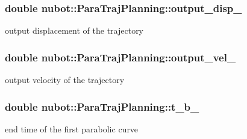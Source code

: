\hypertarget{classnubot_1_1ParaTrajPlanning_a7cb561e9f25a00ef8a2589addcf7bbf8}{
\subsubsection[{output\-\_\-disp\-\_\-}]{\setlength{\rightskip}{0pt plus 5cm}double nubot\-::\-Para\-Traj\-Planning\-::output\-\_\-disp\-\_\-\hspace{0.3cm}{\ttfamily [private]}}}\label{classnubot_1_1ParaTrajPlanning_a7cb561e9f25a00ef8a2589addcf7bbf8}


output displacement of the trajectory 

\hypertarget{classnubot_1_1ParaTrajPlanning_a3a7a57f2f03c1a13b30a4368561cf048}{
\subsubsection[{output\-\_\-vel\-\_\-}]{\setlength{\rightskip}{0pt plus 5cm}double nubot\-::\-Para\-Traj\-Planning\-::output\-\_\-vel\-\_\-\hspace{0.3cm}{\ttfamily [private]}}}\label{classnubot_1_1ParaTrajPlanning_a3a7a57f2f03c1a13b30a4368561cf048}


output velocity of the trajectory 

\hypertarget{classnubot_1_1ParaTrajPlanning_a88e449b3208fe20c0a3dc4e94a02e618}{
\subsubsection[{t\-\_\-b\-\_\-}]{\setlength{\rightskip}{0pt plus 5cm}double nubot\-::\-Para\-Traj\-Planning\-::t\-\_\-b\-\_\-\hspace{0.3cm}{\ttfamily [private]}}}\label{classnubot_1_1ParaTrajPlanning_a88e449b3208fe20c0a3dc4e94a02e618}


end time of the first parabolic curve 

